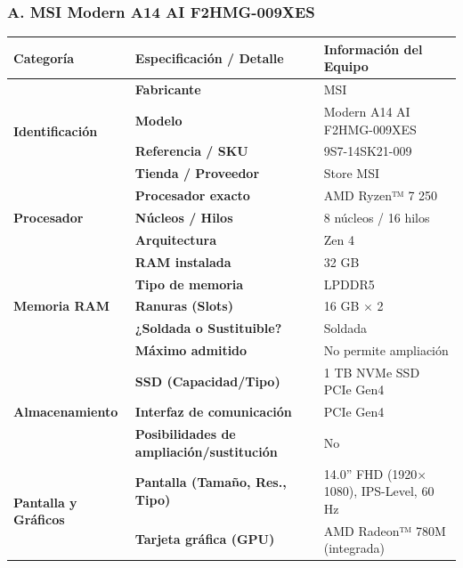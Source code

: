 \documentclass[11.5pt]{article}
\begin{document}
	\subsubsection*{A. MSI Modern A14 AI F2HMG-009XES}
	
	\begin{table}[H]
		\centering
		\footnotesize
		\renewcommand{\arraystretch}{1.2}
		\begin{tabularx}{\textwidth}{|l|l|X|}
			\hline
			\textbf{Categoría} & \textbf{Especificación / Detalle} & \textbf{Información del Equipo} \\
			\hline
			\multirow{4}{*}{\textbf{Identificación}} 
			& \textbf{Fabricante} & MSI \\
			\cline{2-3}
			& \textbf{Modelo} & Modern A14 AI F2HMG-009XES \\
			\cline{2-3}
			& \textbf{Referencia / SKU} & 9S7-14SK21-009 \\
			\cline{2-3}
			& \textbf{Tienda / Proveedor} & Store MSI \\
			\hline
			\multirow{3}{*}{\textbf{Procesador}} 
			& \textbf{Procesador exacto} & AMD Ryzen™ 7 250 \\
			\cline{2-3}
			& \textbf{Núcleos / Hilos} & 8 núcleos / 16 hilos \\
			\cline{2-3}
			& \textbf{Arquitectura} & Zen 4 \\
			\hline
			\multirow{5}{*}{\textbf{Memoria RAM}} 
			& \textbf{RAM instalada} & 32 GB \\
			\cline{2-3}
			& \textbf{Tipo de memoria} & LPDDR5 \\
			\cline{2-3}
			& \textbf{Ranuras (Slots)} & 16 GB \(\times\) 2 \\
			\cline{2-3}
			& \textbf{¿Soldada o Sustituible?} & Soldada \\
			\cline{2-3}
			& \textbf{Máximo admitido} & No permite ampliación \\
			\hline
			\multirow{3}{*}{\textbf{Almacenamiento}} 
			& \textbf{SSD (Capacidad/Tipo)} & 1 TB NVMe SSD PCIe Gen4 \\
			\cline{2-3}
			& \textbf{Interfaz de comunicación} & PCIe Gen4 \\
			\cline{2-3}
			& \textbf{Posibilidades de ampliación/sustitución} & No \\
			\hline
			\multirow{2}{*}{\textbf{Pantalla y Gráficos}} 
			& \textbf{Pantalla (Tamaño, Res., Tipo)} & 14.0'' FHD (1920\(\times\)1080), IPS-Level, 60 Hz \\
			\cline{2-3}
			& \textbf{Tarjeta gráfica (GPU)} & AMD Radeon™ 780M (integrada) \\

\end{tabularx}
\end{table}
\end{document}
